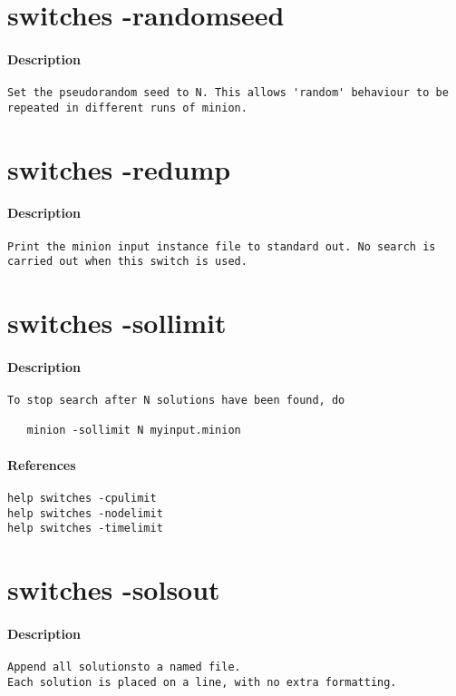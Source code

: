 \section{switches -randomseed}
\paragraph{Description}
{\footnotesize
\begin{verbatim}
Set the pseudorandom seed to N. This allows 'random' behaviour to be
repeated in different runs of minion.
\end{verbatim}
}
\section{switches -redump}
\paragraph{Description}
{\footnotesize
\begin{verbatim}
Print the minion input instance file to standard out. No search is
carried out when this switch is used.
\end{verbatim}
}
\section{switches -sollimit}
\paragraph{Description}
{\footnotesize
\begin{verbatim}
To stop search after N solutions have been found, do

   minion -sollimit N myinput.minion
\end{verbatim}
}
\paragraph{References}
{\footnotesize
\begin{verbatim}
help switches -cpulimit
help switches -nodelimit
help switches -timelimit
\end{verbatim}
}
\section{switches -solsout}
\paragraph{Description}
{\footnotesize
\begin{verbatim}
Append all solutionsto a named file.
Each solution is placed on a line, with no extra formatting.
\end{verbatim}
}
